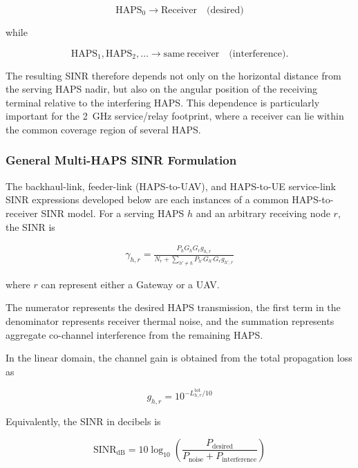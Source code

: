 \documentclass[conference]{IEEEtran}
\begin{document}
\begin{equation}
\mathrm{HAPS}_0
\rightarrow
\mathrm{Receiver}
\quad\text{(desired)}
\end{equation}

while

\begin{equation}
\mathrm{HAPS}_1,\mathrm{HAPS}_2,\ldots
\rightarrow
\mathrm{same\ receiver}
\quad\text{(interference)}.
\end{equation}

The resulting SINR therefore depends not only on the horizontal distance from the serving HAPS nadir, but also on the angular position of the receiving terminal relative to the interfering HAPS. This dependence is particularly important for the 2~GHz service/relay footprint, where a receiver can lie within the common coverage region of several HAPS.


\subsubsection{General Multi-HAPS SINR Formulation}

The backhaul-link, feeder-link (HAPS-to-UAV), and HAPS-to-UE service-link SINR expressions developed below are each instances of a common HAPS-to-receiver SINR model. For a serving HAPS $h$ and an arbitrary receiving node $r$, the SINR is

\begin{equation}
\boxed{
\begin{aligned}
\gamma_{h,r}=\frac{P_hG_hG_r g_{h,r}}{N_r + \displaystyle\sum_{h'\neq h}P_{h'}G_{h'}G_r g_{h',r}}
\end{aligned}}
\label{eq:general-haps-sinr}
\end{equation}

where $r$ can represent either a Gateway or a UAV.

The numerator represents the desired HAPS transmission, the first term in the denominator represents receiver thermal noise, and the summation represents aggregate co-channel interference from the remaining HAPS.

In the linear domain, the channel gain is obtained from the total propagation loss as

\begin{equation}
g_{h,r}= 10^{-L_{h,r}^{\mathrm{tot}}/10}
\end{equation}

Equivalently, the SINR in decibels is

\begin{equation}
\mathrm{SINR}_{\mathrm{dB}}=10\log_{10}\left(\frac{P_{\mathrm{desired}}}{P_{\mathrm{noise}}+P_{\mathrm{interference}}}\right)
\end{equation}
\end{document}
